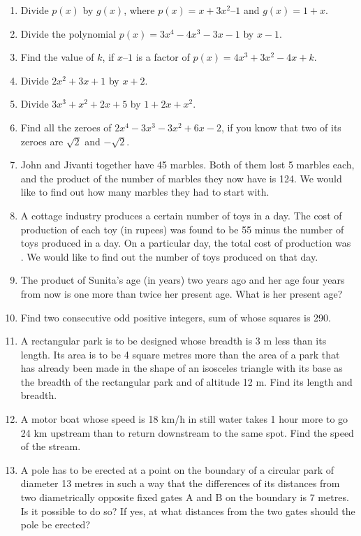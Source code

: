 \renewcommand{\theequation}{\theenumi}
\begin{enumerate}[label=\arabic*.,ref=\thesubsection.\theenumi]
%
\item Divide $p(x)$ by $g(x)$, where $p(x) = x + 3x^2– 1$ and $g(x) = 1 + x$.
\item Divide the polynomial $p(x) = 3x^4-4x^3-3x-1 $ by $x-1$.
\item Find the value of $k$, if $x – 1$ is a factor of $p(x) = 4x^3+ 3x^2 - 4x + k$.
%
\item Divide $2x^2+3x+1$ by $x+2$.
\item Divide $3x^3+x^2+2x+5$ by $1+2x+x^2$.
\item Find all the zeroes of $2x^4-3x^3-3x^2+6x-2$, if you know that two of its zeroes are $\sqrt{2}$ and $-\sqrt{2}$.
\item John and Jivanti together have 45 marbles. Both of them lost 5 marbles each, and the product of the number of marbles they now have is 124. We would like to find out how many marbles they had to start with.
\item  A cottage industry produces a certain number of toys in a day. The cost of production of each toy (in rupees) was found to be 55 minus the number of toys produced in a day. On a particular day, the total cost of production was . We would like to find out the number of toys produced on that day.
\item The product of Sunita’s age (in years) two years ago and her age four years from now is one more than twice her present age. What is her present age?
\item Find two consecutive odd positive integers, sum of whose squares is 290.
\item A rectangular park is to be designed whose breadth is 3 m less than its length. Its area is to be 4 square metres more than the area of a park that has already been made in the shape of an isosceles triangle with its base as the breadth of the rectangular park and of altitude 12 m. Find its length and breadth.
\item A motor boat whose speed is 18 km/h in still water takes 1 hour more to go 24 km upstream than to return downstream to the same spot. Find the speed of the stream.
\item A pole has to be erected at a point on the boundary of a circular park of diameter 13 metres in such a way that the differences of its distances from two diametrically opposite fixed gates A and B on the boundary is 7 metres. Is it possible to do so? If yes, at what distances from the two gates should the pole be erected?
\end{enumerate}
